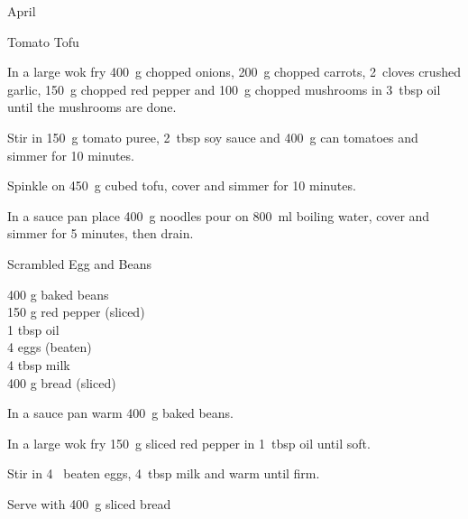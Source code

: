 \begin{menu}{April}
\begin{recipe}{2}{Tomato Tofu}
	
    \begin{instructions}
    \item 
        In a large wok fry
        400~g chopped onions,
        200~g chopped carrots,
        2~cloves crushed garlic,
        150~g chopped red pepper
        and
        100~g chopped mushrooms
        in
        3~tbsp  oil
        until the mushrooms are done.
      \item 
        Stir in
        150~g  tomato puree,
        2~tbsp  soy sauce
        and
        400~g  can tomatoes
        and simmer for 10 minutes.
      \item 
        Spinkle on
        450~g cubed tofu,
        cover and simmer for 10 minutes.
      \item 
    In a
    sauce pan
    place
    400~g  noodles
    pour on
    800~ml  boiling water,
    cover and simmer for 5 minutes, then drain.
  
    \end{instructions}
    \end{recipe}%
  
    \begin{recipe}{1}{Scrambled Egg and Beans}%
		\begin{ingredients}
		400 g baked beans  \\
	150 g red pepper (sliced) \\
	1 tbsp oil  \\
	4  eggs (beaten) \\
	4 tbsp milk  \\
	400 g bread (sliced) \\
	
		\end{ingredients}
	
	
    \begin{instructions}
    \item 
        In a sauce pan warm
        400~g  baked beans.
      \item 
        In a large wok fry
        150~g sliced red pepper
        in
        1~tbsp  oil
        until soft.
      \item 
        Stir in
        4~ beaten eggs,
        4~tbsp  milk
        and warm until firm.
      \item 
        Serve with
        400~g sliced bread
    \end{instructions}
    \end{recipe}%
  
    \clearpage
    \end{menu}
	
